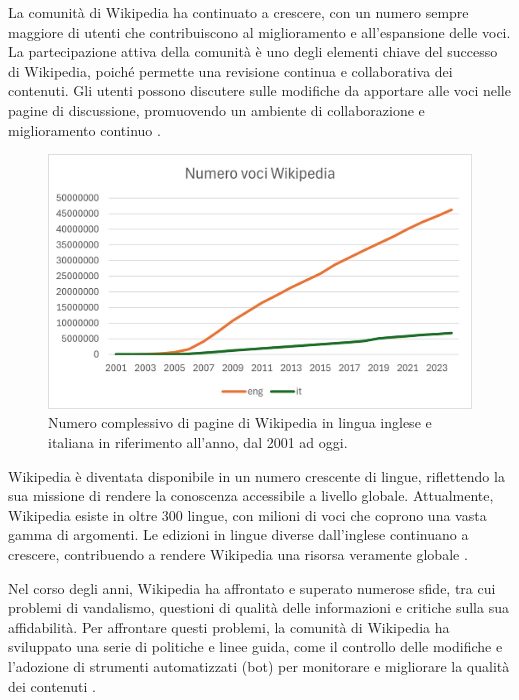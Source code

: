 \documentclass[12pt,a4paper]{report}
\begin{document}
La comunità di Wikipedia ha continuato a crescere, con un numero sempre maggiore di utenti che contribuiscono al miglioramento e all'espansione delle voci. La partecipazione attiva della comunità è uno degli elementi chiave del successo di Wikipedia, poiché permette una revisione continua e collaborativa dei contenuti. Gli utenti possono discutere sulle modifiche da apportare alle voci nelle pagine di discussione, promuovendo un ambiente di collaborazione e miglioramento continuo \cite{denning2005wikipedia}.

\begin{figure}
    \includegraphics[width=\linewidth]{Immagini/Grafico pagine wikipedia excel.png}
    \caption{Numero complessivo di pagine di Wikipedia in lingua inglese e italiana in riferimento all'anno, dal 2001 ad oggi.\cite{wikimedia_stats} }
    \captionsetup{width=.8\linewidth}
    \label{fig:wikiPagesYear}
\end{figure}

Wikipedia è diventata disponibile in un numero crescente di lingue, riflettendo la sua missione di rendere la conoscenza accessibile a livello globale. Attualmente, Wikipedia esiste in oltre 300 lingue, con milioni di voci che coprono una vasta gamma di argomenti. Le edizioni in lingue diverse dall'inglese continuano a crescere, contribuendo a rendere Wikipedia una risorsa veramente globale \cite{reagle2010good}.

Nel corso degli anni, Wikipedia ha affrontato e superato numerose sfide, tra cui problemi di vandalismo, questioni di qualità delle informazioni e critiche sulla sua affidabilità. Per affrontare questi problemi, la comunità di Wikipedia ha sviluppato una serie di politiche e linee guida, come il controllo delle modifiche e l'adozione di strumenti automatizzati (bot) per monitorare e migliorare la qualità dei contenuti \cite{jemielniak2014wikipedia}.
\end{document}
